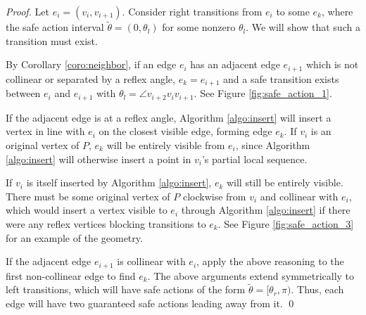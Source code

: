 \documentclass[sageh,times,Review]{sagej}
\begin{document}
\begin{proof}

Let $e_i = (v_i, v_{i+1})$. Consider right transitions from $e_i$ to some $e_k$,
where the safe action interval $\tilde{\theta} = (0, \theta_l)$ for some 
nonzero $\theta_l$. We will show that such a transition must exist. 

By Corollary \ref{coro:neighbor}, if an edge $e_i$ has an adjacent edge
$e_{i+1}$ which is not collinear or separated by a reflex angle, 
$e_k = e_{i+1}$ and a safe transition exists
between $e_i$ and $e_{i+1}$ with $\theta_l = \angle v_{i+2} v_i v_{i+1}$. 
See Figure \ref{fig:safe_action_1}.

If the adjacent edge is at a reflex angle, Algorithm 
\ref{algo:insert} will insert a vertex in line with $e_i$ on the closest visible
edge, forming edge $e_k$. If $v_i$ is an original
vertex of $P$, $e_k$ will be entirely visible from $e_i$, since Algorithm
\ref{algo:insert} will otherwise insert a point in $v_i$'s partial local
sequence.

If $v_i$ is itself inserted by Algorithm \ref{algo:insert}, $e_k$ will still be
entirely visible. There must be some original vertex of $P$
clockwise from $v_i$ and collinear with $e_i$, which would insert a vertex
visible to $e_i$ through Algorithm \ref{algo:insert} if there were any reflex vertices
blocking transitions to $e_k$.
See Figure \ref{fig:safe_action_3} for an example of the geometry.

If the adjacent edge $e_{i+1}$ is collinear with $e_i$, apply the above reasoning 
to the first non-collinear edge to find $e_k$.
The above arguments extend symmetrically to left transitions, which will have
safe actions of the form $\tilde{\theta} = [\theta_r, \pi)$. Thus, each edge will 
have two guaranteed safe actions leading away from it. \qed
\end{proof}
\end{document}
